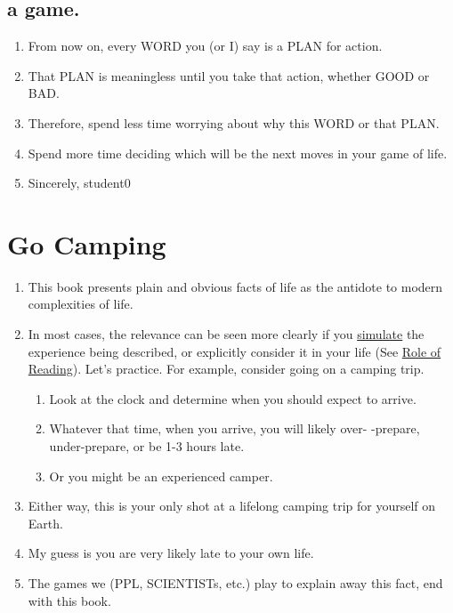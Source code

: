 \documentclass[
]{book}
\providecommand{\tightlist}{%
  \setlength{\itemsep}{0pt}\setlength{\parskip}{0pt}}
\begin{document}
\hypertarget{a-game.}{%
\subsection{a game.}\label{a-game.}}

\begin{enumerate}
\def\labelenumi{\arabic{enumi}.}
\setcounter{enumi}{8}
\item
  From now on, every WORD you (or I) say is a PLAN for action.
\item
  That PLAN is meaningless until you take that action, whether GOOD or BAD.
\item
  Therefore, spend less time worrying about why this WORD or that PLAN.
\item
  Spend more time deciding which will be the next moves in your game of life.
\item
  Sincerely, student0
\end{enumerate}

\hypertarget{go-camping}{%
\section{Go Camping}\label{go-camping}}

\begin{enumerate}
\def\labelenumi{\arabic{enumi}.}
\setcounter{enumi}{12}
\tightlist
\item
  This book presents plain and obvious facts of life as the antidote to modern complexities of life.
\item
  In most cases, the relevance can be seen more clearly if you \protect\hyperlink{words}{simulate} the experience being described, or explicitly consider it in your life (See \protect\hyperlink{read}{Role of Reading}). Let's practice. For example, consider going on a camping trip.

  \begin{enumerate}
  \def\labelenumii{\arabic{enumii}.}
  \tightlist
  \item
    Look at the clock and determine when you should expect to arrive.
  \item
    Whatever that time, when you arrive, you will likely over- -prepare, under-prepare, or be 1-3 hours late.
  \item
    Or you might be an experienced camper.
  \end{enumerate}
\item
  Either way, this is your only shot at a lifelong camping trip for yourself on Earth.
\item
  My guess is you are very likely late to your own life.
\item
  The games we (PPL, SCIENTISTs, etc.) play to explain away this fact, end with this book.
\end{enumerate}
\end{document}

